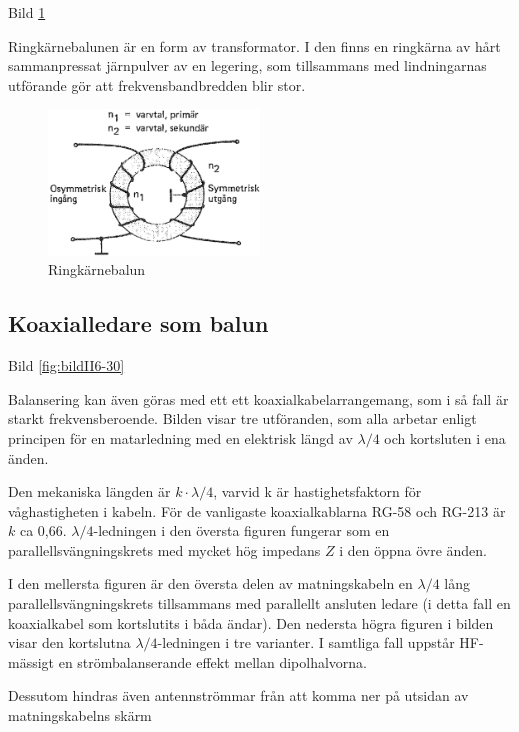 Bild \ref{fig:bildII6-29}

Ringkärnebalunen är en form av transformator. I den finns en ringkärna
av hårt sammanpressat järnpulver av en legering, som tillsammans med
lindningarnas utförande gör att frekvensbandbredden blir stor.

\begin{figure}
  \includegraphics[width=0.5\textwidth]{images/cropped_pdfs/bild_2_6-29.pdf}
  \caption{Ringkärnebalun}
  \label{fig:bildII6-29}
\end{figure}

\subsection{Koaxialledare som balun}

Bild \ref{fig:bildII6-30}

Balansering kan även göras med ett ett koaxialkabelarrangemang, som i
så fall är starkt frekvensberoende. Bilden visar tre utföranden, som
alla arbetar enligt principen för en matarledning med en elektrisk
längd av \(\lambda/4\) och kortsluten i ena änden.

Den mekaniska längden är \(k\cdot\lambda/4\), varvid k är
hastighetsfaktorn för våghastigheten i kabeln. För de vanligaste
koaxialkablarna RG-58 och RG-213 är \(k\) ca 0,66.
\(\lambda/4\)-ledningen i den översta figuren fungerar som en
parallellsvängningskrets med mycket hög impedans \(Z\) i den öppna
övre änden.

I den mellersta figuren är den översta delen av matningskabeln en
\(\lambda/4\) lång parallellsvängningskrets tillsammans med parallellt
ansluten ledare (i detta fall en koaxialkabel som kortslutits i båda
ändar). Den nedersta högra figuren i bilden visar den kortslutna
\(\lambda/4\)-ledningen i tre varianter. I samtliga fall uppstår
HF-mässigt en strömbalanserande effekt mellan dipolhalvorna.

Dessutom hindras även antennströmmar från att komma ner på utsidan av
matningskabelns skärm

